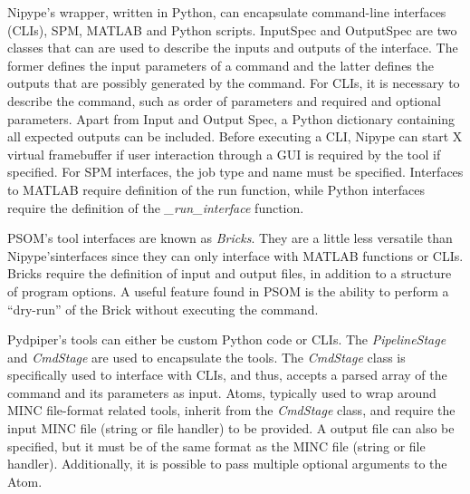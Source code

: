             Nipype's wrapper, written in Python, can encapsulate command-line interfaces (CLIs), SPM, 
            MATLAB and Python scripts. InputSpec and OutputSpec are two classes 
            that can are used to describe the inputs and outputs of the 
            interface. The former defines the input parameters of 
            a command and the latter defines the outputs that are possibly 
            generated by the command. For CLIs, it is necessary to describe the
            command, such as order of parameters and required and optional parameters. 
            Apart from Input and Output Spec, a Python dictionary containing all
            expected outputs can be included.
            Before executing a CLI, Nipype can start X virtual framebuffer if 
            user interaction through a GUI is required by the tool if specified. 
            For SPM interfaces, the job 
            type and name must be specified. Interfaces to MATLAB require 
            definition of the run function, while Python interfaces require
            the definition of the \textit{\_run\_interface} function.
            
            PSOM’s tool interfaces are known as \textit{Bricks}. They are a 
            little less versatile than Nipype'sinterfaces since they can only
            interface with MATLAB functions or CLIs. Bricks require the 
            definition of input and output files, in addition to a structure of 
            program options. A useful feature found in PSOM is the ability to 
            perform a “dry-run” of the Brick without executing the command.

            Pydpiper's tools can either be custom Python code or CLIs. The 
            \textit{PipelineStage} and \textit{CmdStage} are used to 
            encapsulate the tools. The \textit{CmdStage} class is specifically 
            used to interface with CLIs, and thus, accepts a parsed array of the
            command and its parameters as input. Atoms, typically used to wrap
            around MINC file-format related tools, inherit from the
            \textit{CmdStage} class, and require the input MINC file (string or
            file handler) to be provided. A output file can also be specified, 
            but it must be of the same format as the MINC file (string or file 
            handler). Additionally, it is possible to pass multiple optional 
            arguments to the Atom.

